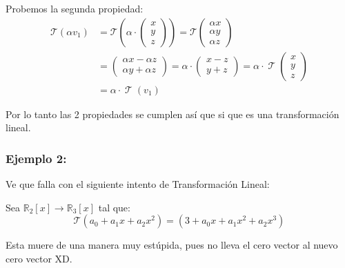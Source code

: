 \documentclass[12pt, fleqn]{report}                             %
\theoremstyle{break}                                            %
\DeclareMathOperator \LinTrans {\mathcal{T}}                    %
\newcommand{\Wrap}[1]    {\left( #1 \right)}                    %
\newcommand{\FnLinTrans}[1]{\mathcal{T}\Wrap{#1}}               %
\newcommand{\VecLinTrans}[1]{\mathcal{T}\pVector{#1}}           %
\newcommand{\pVector}[1]                                        %
        { \ensuremath{\begin{pmatrix}#1\end{pmatrix}} }             %
\begin{document}
                    Probemos la segunda propiedad:
                    \begin{equation*}
                    \begin{split}
                        \FnLinTrans{\alpha v_1}                                                      
                            &= \FnLinTrans{\alpha \cdot \pVector{x\\y\\z} }                      
                             = \VecLinTrans{\alpha x\\\alpha y\\\alpha z}                                   \\
                            &= \pVector{\alpha x - \alpha z\\ \alpha y + \alpha z}                                      
                             = \alpha \cdot \pVector{x-z\\y+z}                                                          
                             = \alpha \cdot \LinTrans \pVector{x\\y\\z}                                     \\
                            &= \alpha \cdot \LinTrans (v_1)                                                 
                    \end{split}
                    \end{equation*}

                    Por lo tanto las 2 propiedades se cumplen así que si que es una transformación lineal.

                \clearpage
                \subsubsection{Ejemplo 2:}

                    Ve que falla con el siguiente intento de Transformación Lineal:

                    Sea $\mathbb{R}_2[x] \to \mathbb{R}_3[x]$ tal que:
                    \begin{equation*}
                        \FnLinTrans{a_0+a_1x+a_2x^2} = \Wrap{3+a_0x+a_1x^2+a_2x^3}
                    \end{equation*}

                    Esta muere de una manera muy estúpida, pues no lleva el cero vector al nuevo cero vector XD.
\end{document}
